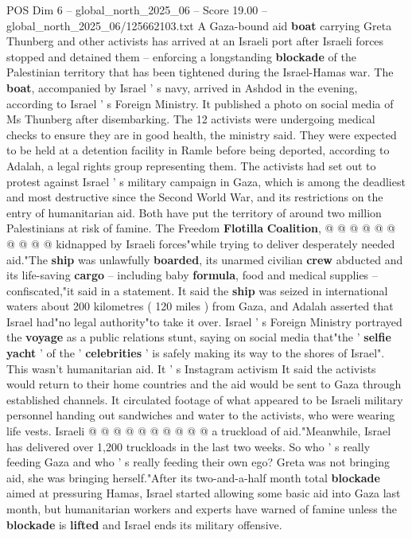 \begin{textsample}{POS Dim 6 – global\_north\_2025\_06 – Score 19.00 – global\_north\_2025\_06/125662103.txt}  \label{ex:f6_pos_023}
A Gaza-bound aid \textbf{boat} carrying Greta Thunberg and other activists has arrived at an Israeli port after Israeli forces stopped and detained them -- enforcing a longstanding \textbf{blockade} of the Palestinian territory that has been tightened during the Israel-Hamas war.
The \textbf{boat}, accompanied by Israel ' s navy, arrived in Ashdod in the evening, according to Israel ' s Foreign Ministry.
It published a photo on social media of Ms Thunberg after disembarking.
The 12 activists were undergoing medical checks to ensure they are in good health, the ministry said.
They were expected to be held at a detention facility in Ramle before being deported, according to Adalah, a legal rights group representing them.
The activists had set out to protest against Israel ' s military campaign in Gaza, which is among the deadliest and most destructive since the Second World War, and its restrictions on the entry of humanitarian aid.
Both have put the territory of around two million Palestinians at risk of famine.
The Freedom \textbf{Flotilla} \textbf{Coalition}, @ @ @ @ @ @ @ @ @ @ kidnapped by Israeli forces"while trying to deliver desperately needed aid."The \textbf{ship} was unlawfully \textbf{boarded}, its unarmed civilian \textbf{crew} abducted and its life-saving \textbf{cargo} -- including baby \textbf{formula}, food and medical supplies -- confiscated,"it said in a statement.
It said the \textbf{ship} was seized in international waters about 200 kilometres ( 120 miles ) from Gaza, and Adalah asserted that Israel had"no legal authority"to take it over.
Israel ' s Foreign Ministry portrayed the \textbf{voyage} as a public relations stunt, saying on social media that"the ' \textbf{selfie} \textbf{yacht} ' of the ' \textbf{celebrities} ' is safely making its way to the shores of Israel".
This wasn't humanitarian aid.
It ' s Instagram activism It said the activists would return to their home countries and the aid would be sent to Gaza through established channels.
It circulated footage of what appeared to be Israeli military personnel handing out sandwiches and water to the activists, who were wearing life vests.
Israeli @ @ @ @ @ @ @ @ @ @ a truckload of aid."Meanwhile, Israel has delivered over 1,200 truckloads in the last two weeks.
So who ' s really feeding Gaza and who ' s really feeding their own ego?
Greta was not bringing aid, she was bringing herself."After its two-and-a-half month total \textbf{blockade} aimed at pressuring Hamas, Israel started allowing some basic aid into Gaza last month, but humanitarian workers and experts have warned of famine unless the \textbf{blockade} is \textbf{lifted} and Israel ends its military offensive.

\end{textsample}
